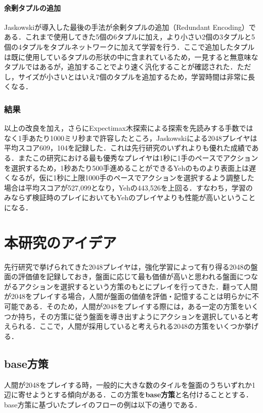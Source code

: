\documentclass{suribt}
\begin{document}
\subsubsection{余剰タプルの追加}
Jaskowskiが導入した最後の手法が余剰タプルの追加（Redundant Encoding）である．これまで使用してきた5個の6タプルに加え，より小さい2個の3タプルと5個の4タプルをタプルネットワークに加えて学習を行う．ここで追加したタプルは既に使用しているタプルの形状の中に含まれているため，一見すると無意味なタプルではあるが，追加することでより速く汎化することが確認された．ただし，サイズが小さいとはいえ7個のタプルを追加するため，学習時間は非常に長くなる．

\subsection{結果}
以上の改良を加え，さらにExpectimax木探索による探索を先読みする手数ではなく1手あたり1000ミリ秒まで許容したところ，Jaskowskiによる2048プレイヤは平均スコア609，104を記録した．これは先行研究のいずれよりも優れた成績である．またこの研究における最も優秀なプレイヤは1秒に1手のペースでアクションを選択するため，1秒あたり500手進めることができるYehのものより表面上は遅くなるが，仮に1秒に上限1000手のペースでアクションを選択するよう調整した場合は平均スコアが527,099となり，Yehの443,526を上回る．すなわち，学習のみならず検証時のプレイにおいてもYehのプレイヤよりも性能が高いということになる．

\chapter{本研究のアイデア}
先行研究で挙げられてきた2048プレイヤは，強化学習によって有り得る2048の盤面の評価値を記録しておき，盤面に応じて最も価値が高いと思われる盤面につながるアクションを選択するという方策のもとにプレイを行ってきた．翻って人間が2048をプレイする場合，人間が盤面の価値を評価・記憶することは明らかに不可能である．そのため，人間が2048をプレイする際には，ある一定の方策をいくつか持ち，その方策に従う盤面を導き出すようにアクションを選択していると考えられる．ここで，人間が採用していると考えられる2048の方策をいくつか挙げる．

\section{base方策}
人間が2048をプレイする時，一般的に大きな数のタイルを盤面のうちいずれか1辺に寄せようとする傾向がある．この方策を\textbf{base方策}と名付けることとする．base方策に基づいたプレイのフローの例は以下の通りである．
\end{document}
